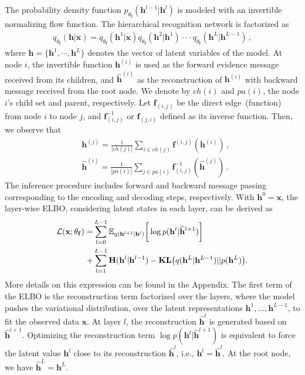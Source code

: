 \documentclass[twoside]{article}
\begin{document}
The probability density function $p_{\theta_{\mathbf{f}}}(\mathbf{h}^{l-1} | \mathbf{h}^{l})$ is modeled with an invertible normalizing flow function.
The hierarchical recognition network is factorized as
\begin{align*}
q_{\theta_{\mathbf{f}}}(\mathbf{h}| \mathbf{x}) =  q_{\theta_{\mathbf{f}}}(\mathbf{h}^1 | \mathbf{x})  q_{\theta_{\mathbf{f}}}(\mathbf{h}^2 | \mathbf{h}^1) \cdot \cdot  \cdot  q_{\theta_{\mathbf{f}}}(\mathbf{h}^{L} | \mathbf{h}^{L-1}) \, ,
\end{align*}
where $\mathbf{h}=\{\mathbf{h}^1, \cdots, \mathbf{h}^L \}$ denotes the vector of latent variables of the model.
At node $i$, the invertible function $\mathbf{h}^{(i)}$ is used as the forward evidence message received from its children, and $\widehat{\mathbf{h}}^{(i)}$ as the  reconstruction of $\mathbf{h}^{(i)}$ with backward message received from the root node. 
We denote by $ch(i)$ and $pa(i)$, the node $i$'s child set and parent, respectively. 
Let $\mathbf{f}_{(i, j)}$ be the direct edge~(function) from node $i$ to node $j$, and $\mathbf{f}^{-1}_{ (i, j)}$ or  $\mathbf{f}_{ (j, i)}$ defined as its inverse function.
 Then, we observe that
\begin{align*}
&  \mathbf{h}^{(j)} = \frac{1}{|ch(j)|} \sum_{i \in ch(j) } \mathbf{f}^{(i,j)}(\mathbf{h}^{(i)})  \, ,\\
& \widehat{\mathbf{h}}^{(i)} = \frac{1}{|pa(i)|} \sum_{j \in pa(i) } \mathbf{f}^{-1}_{ (i,j)}(\widehat{\mathbf{h}}^{(j)}) \, .
\end{align*} 
The inference procedure includes forward and backward message passing corresponding to the encoding and decoding steps, respectively. 
With $\mathbf{h}^0 = \mathbf{x}$, the layer-wise ELBO, considering latent states in each layer, can be derived as 
\begin{align} \label{eq:elbo_tree}
\mathcal{L}(\mathbf{x}; \theta_{\mathbf{f}}) = & \sum_{l=0}^{L-1}  \mathbb{E}_{q(\mathbf{h}^{l+1}|\mathbf{h}^l)} \bigg[ \log p( \mathbf{h}^{l}|  \widehat{\mathbf{h}}^{l+1})   \bigg]  \\ \notag
 +  & \sum_{l=1}^{L-1}   \textbf{\text{H}}(\mathbf{h}^l | \mathbf{h}^{l-1} )-   \textbf{\text{KL}}\big(q(\mathbf{h}^L | \mathbf{h}^{L-1} )  || p(\mathbf{h}^L)  \big).
\end{align}
More details on this expression can be found in the Appendix. 
The first term of the ELBO is the reconstruction term factorized over the layers, where the model pushes the variational distribution, over the latent representations $\mathbf{h}^1, ..., \mathbf{h}^{L-1}$, to fit the observed data $\mathbf{x}$.
At layer $l$, the reconstruction $\widehat{\mathbf{h}}^l$ is generated based on $\widehat{\mathbf{h}}^{l+1}$. 
Optimizing the reconstruction term  $\log p( \mathbf{h}^{l}|  \widehat{\mathbf{h}}^{l+1})$ is equivalent to force the latent value $\mathbf{h}^l$ close to its reconstruction $\widehat{\mathbf{h}}^l$, i.e., $\mathbf{h}^l = \widehat{\mathbf{h}}^l$. 
At the root node, we have $\widehat{\mathbf{h}}^L = \mathbf{h}^L$.
\end{document}
